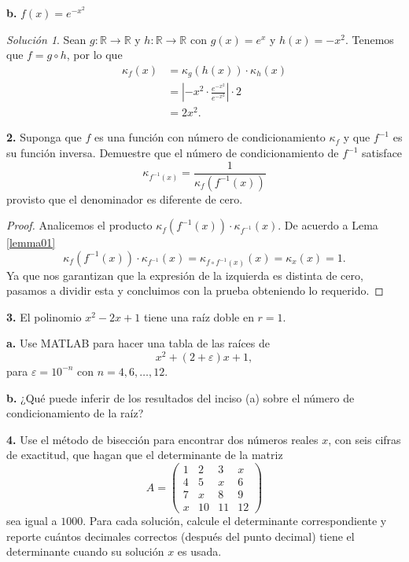 \documentclass{article}
\newenvironment{statement}[1]{\smallskip\noindent\color[rgb]{1.00,0.00,0.50} {\bf #1.}}{}
\theoremstyle{definition}
\theoremstyle{remark}
\newtheorem*{solution}{Soluci\'on}
\newcommand{\BR}{\mathbb R}
\begin{document}
\begin{statement}{b}
  $f(x) = e^{-x^2}$
\end{statement}

\begin{solution}
  Sean $g: \BR \to \BR$ y $h: \BR \to \BR$ con $g(x) = e^x$ y $h(x) = -x^2$.
  Tenemos que $f = g \circ h$, por lo que
  \begin{align*}
    \kappa_f(x) &= \kappa_g(h(x)) \cdot \kappa_h(x) \\
    &= \left|-x^2 \cdot \frac{e^{-x^2}}{e^{-x^2}}\right|\cdot 2 \\
    &= 2x^2.
  \end{align*}
\end{solution}

\begin{statement}{2}
  Suponga que $f$ es una funci\'on con n\'umero de condicionamiento
  $\kappa_f$ y que $f^{-1}$ es su funci\'on inversa. Demuestre que el n\'umero
  de condicionamiento de $f^{-1}$ satisface
  \[
    \kappa_{f^{-1}(x)} = \frac{1}{\kappa_f(f^{-1}(x))}
  \]
  provisto que el denominador es diferente de cero.
\end{statement}

\begin{proof}
  Analicemos el producto $\kappa_f(f^{-1}(x)) \cdot \kappa_{f^{-1}}(x)$.
  De acuerdo a Lema \ref{lemma01}
  \[
    \kappa_f(f^{-1}(x)) \cdot \kappa_{f^{-1}}(x) = \kappa_{f \circ f^{-1}(x)}(x) = \kappa_x(x) = 1.
  \]
  Ya que nos garantizan que la expresi\'on de la izquierda es distinta de cero,
  pasamos a dividir esta y concluimos con la prueba obteniendo lo requerido.
\end{proof}

\begin{statement}{3}
  El polinomio $x^2 - 2x + 1$ tiene una ra\'iz doble en $r = 1$.
\end{statement}

\begin{statement}{a}
  Use MATLAB para hacer una tabla de las ra\'ices de
  \[
    x^2 + (2 + \varepsilon)x + 1,  
  \]
  para $\varepsilon = 10^{-n}$ con $n = 4, 6, \dots, 12$.
\end{statement}

\begin{statement}{b}
  ¿Qu\'e puede inferir de los resultados del inciso (a) sobre el n\'umero de
  condicionamiento de la ra\'iz?
\end{statement}

\begin{statement}{4}
  Use el m\'etodo de bisecci\'on para encontrar dos n\'umeros reales $x$, con
  seis cifras de exactitud, que hagan que el determinante de la matriz
  \[
    A = \begin{pmatrix}
      1 & 2 & 3 & x \\
      4 & 5 & x & 6 \\
      7 & x & 8 & 9 \\
      x & 10 & 11 & 12
    \end{pmatrix}  
  \]
  sea igual a $1000$. Para cada soluci\'on, calcule el determinante
  correspondiente y reporte cu\'antos decimales correctos (despu\'es del punto
  decimal) tiene el determinante cuando su soluci\'on $x$ es usada.
\end{statement}
\end{document}
